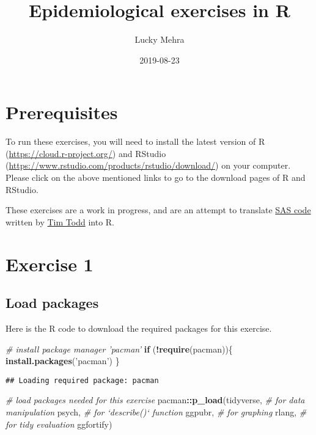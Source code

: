 \documentclass[]{book}
\title{Epidemiological exercises in R}
\author{Lucky Mehra}
\date{2019-08-23}
\newenvironment{Shaded}{\begin{snugshade}}{\end{snugshade}}
\newcommand{\CommentTok}[1]{\textcolor[rgb]{0.56,0.35,0.01}{\textit{#1}}}
\newcommand{\ControlFlowTok}[1]{\textcolor[rgb]{0.13,0.29,0.53}{\textbf{#1}}}
\newcommand{\KeywordTok}[1]{\textcolor[rgb]{0.13,0.29,0.53}{\textbf{#1}}}
\newcommand{\NormalTok}[1]{#1}
\newcommand{\OperatorTok}[1]{\textcolor[rgb]{0.81,0.36,0.00}{\textbf{#1}}}
\newcommand{\StringTok}[1]{\textcolor[rgb]{0.31,0.60,0.02}{#1}}
\begin{document}
\maketitle

{
\setcounter{tocdepth}{1}
\tableofcontents
}
\hypertarget{prerequisites}{%
\chapter*{Prerequisites}\label{prerequisites}}

To run these exercises, you will need to install the latest version of R (\url{https://cloud.r-project.org/}) and RStudio (\url{https://www.rstudio.com/products/rstudio/download/}) on your computer. Please click on the above mentioned links to go to the download pages of R and RStudio.

These exercises are a work in progress, and are an attempt to translate \protect\hyperlink{sascode}{SAS code} written by \href{https://www.plantpath.k-state.edu/people/faculty/todd-timothy/}{Tim Todd} into R.

\hypertarget{ex1}{%
\chapter{Exercise 1}\label{ex1}}

\hypertarget{load-packages}{%
\section{Load packages}\label{load-packages}}

Here is the R code to download the required packages for this exercise.

\begin{Shaded}
\begin{Highlighting}[]
\CommentTok{# install package manager 'pacman'}
\ControlFlowTok{if}\NormalTok{ (}\OperatorTok{!}\KeywordTok{require}\NormalTok{(pacman))\{}
  \KeywordTok{install.packages}\NormalTok{(}\StringTok{'pacman'}\NormalTok{)}
\NormalTok{\}}
\end{Highlighting}
\end{Shaded}

\begin{verbatim}
## Loading required package: pacman
\end{verbatim}

\begin{Shaded}
\begin{Highlighting}[]
\CommentTok{# load packages needed for this exercise}
\NormalTok{pacman}\OperatorTok{::}\KeywordTok{p_load}\NormalTok{(tidyverse, }\CommentTok{# for data manipulation}
\NormalTok{                             psych, }\CommentTok{# for `describe()` function}
\NormalTok{                             ggpubr, }\CommentTok{# for graphing}
\NormalTok{                             rlang, }\CommentTok{# for tidy evaluation}
\NormalTok{                             ggfortify)}
\end{Highlighting}
\end{Shaded}
\end{document}
